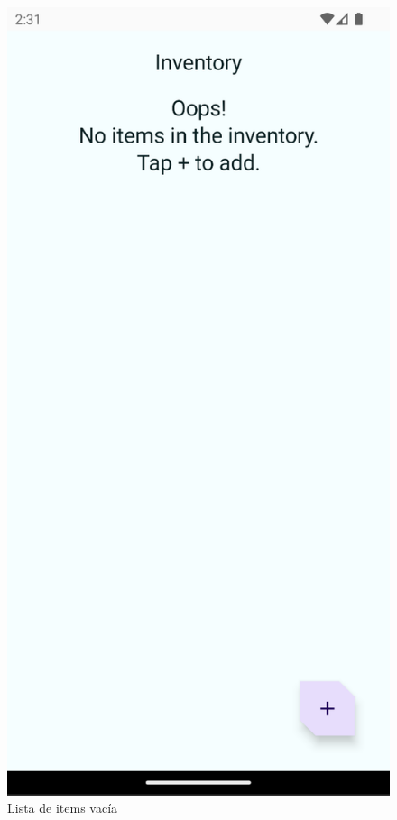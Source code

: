 \documentclass{article}
\begin{document}
        \begin{figure}[H]
            \centerline{\includegraphics[scale=0.3]{codelab2_1.png}}
            \caption{Lista de items vacía}
            \label{fig:codelab2_1}
        \end{figure}
\end{document}
